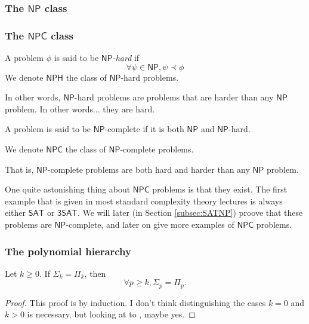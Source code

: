 \subsubsection{The $ \mathsf{NP} $ class}

\subsubsection{The $ \mathsf{NPC} $ class}

\begin{definition}
    A problem $ \phi $ is said to be \textit{$ \mathsf{NP} $-hard} if
    \[
        \forall \psi \in \mathsf{NP}, \psi \prec \phi
    \]
    We denote $ \mathsf{NPH} $ the class of $ \mathsf{NP} $-hard problems.
\end{definition}

In other words, $ \mathsf{NP} $-hard problems are problems that are harder than any $ \mathsf{NP} $ problem. In other words... they are hard.

\begin{definition}
    A problem is said to be $ \mathsf{NP} $-complete if it is both $ \mathsf{NP} $ and $ \mathsf{NP} $-hard.

    We denote $ \mathsf{NPC} $ the class of $ \mathsf{NP} $-complete problems.
\end{definition}

That is, $ \mathsf{NP} $-complete problems are both hard and harder than any $ \mathsf{NP} $ problem. 

One quite astonishing thing about $ \mathsf{NPC} $ problems is that they exist. The first example that is given in most standard complexity theory lectures is always either $ \mathsf{SAT} $ or $ \mathsf{3SAT} $. We will later (in Section \ref{subsec:SATNP}) proove that these problems are $ \mathsf{NP} $-complete, and later on give more examples of $ \mathsf{NPC} $ problems.

\subsubsection{The polynomial hierarchy}

\begin{proposition}
    Let $ k \ge 0 $.
    If $ \Sigma_k = \Pi_k $, then
    \[
        \forall p \ge k, \Sigma_p = \Pi_p.
    \]
\end{proposition}

\begin{proof}
    This proof is by induction. I don't think distinguishing the cases $ k = 0 $ and $ k > 0 $ is necessary, but looking at to \cite{gowers2024}, maybe yes.
\end{proof}

